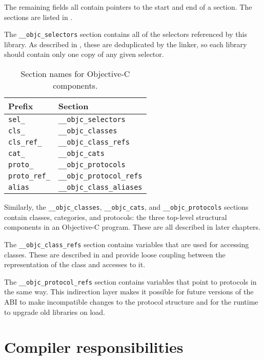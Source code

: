 \documentclass[a4paper]{report}
\newcommand{\ccode}[1]{\lstinline[language={C}]{#1}}
\newcommand{\inccode}[4]{
{
	 }}
	]{../#1}
}
}
\begin{document}
The remaining fields all contain pointers to the start and end of a section.
The sections are listed in .

\inccode{loader.c}{initobjc}{objc_init}{The Objective-C library description structure.}

The \ccode{__objc_selectors} section contains all of the selectors referenced by this library.
As described in , these are deduplicated by the linker, so each library should contain only one copy of any given selector.

\begin{table}
	\begin{center}
		\begin{tabular}{l|l}
			Prefix & Section \\\hline
			\ccode{sel_} & \ccode{__objc_selectors}\\
			\ccode{cls_} & \ccode{__objc_classes}\\
			\ccode{cls_ref_} & \ccode{__objc_class_refs}\\
			\ccode{cat_} & \ccode{__objc_cats}\\
			\ccode{proto_} & \ccode{__objc_protocols}\\
			\ccode{proto_ref_} & \ccode{__objc_protocol_refs}\\
			\ccode{alias} & \ccode{__objc_class_aliases}\\
		\end{tabular}
		\caption{\label{tab:sections}Section names for Objective-C components.}
	\end{center}
\end{table}

Similarly, the \ccode{__objc_classes}, \ccode{__objc_cats}, and \ccode{__objc_protocols} sections contain classes, categories, and protocols: the three top-level structural components in an Objective-C program.
These are all described in later chapters.

The \ccode{__objc_class_refs} section contains variables that are used for accessing classes.
These are described in  and provide loose coupling between the representation of the class and accesses to it.

The \ccode{__objc_protocol_refs} section contains variables that point to protocols in the same way.
This indirection layer makes it possible for future versions of the ABI to make incompatible changes to the protocol structure and for the runtime to upgrade old libraries on load.

\section{Compiler responsibilities}
\end{document}
